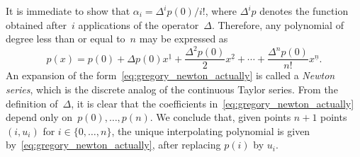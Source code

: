It is immediate to show that $\alpha_i = \Delta^i p(0) / i!$,
where $\Delta^i p$ denotes the function obtained after~$i$ applications of the operator~$\Delta$.
Therefore, any polynomial of degree less than or equal to~$n$ may be expressed as
\begin{equation}
    \label{eq:gregory_newton_actually}
    p(x) = p(0) + \Delta p(0) x^{\underline{1}} + \frac{\Delta^2 p(0)}{2} x^{\underline{2}} + \dotsb + \frac{\Delta^n p(0)}{n!} x^{\underline{n}}.
\end{equation}
An expansion of the form~\eqref{eq:gregory_newton_actually} is called a \emph{Newton series},
which is the discrete analog of the continuous Taylor series.
From the definition of~$\Delta$,
it is clear that the coefficients in~\eqref{eq:gregory_newton_actually} depend only on~$p(0), \dotsc, p(n)$.
We conclude that, given points $n+1$ points $(i, u_i)$ for $i \in \{0, \dotsc, n\}$,
the unique interpolating polynomial is given by~\eqref{eq:gregory_newton_actually},
after replacing $p(i)$ by $u_i$.


